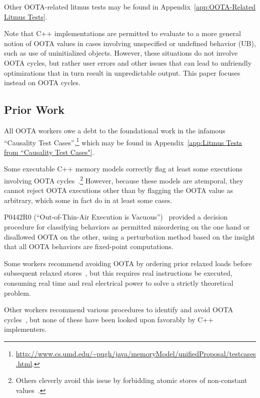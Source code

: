 \documentclass[10]{article}
\begin{document}
Other OOTA-related litmus tests may be found in
Appendix~\ref{app:OOTA-Related Litmus Tests}.

Note that C++ implementations are permitted to evaluate to a more
general notion of OOTA values in cases involving unspecified or undefined
behavior (UB), such as use of uninitialized objects.
However, these situations do not involve OOTA cycles, but rather user
errors and other issues that can lead to unfriendly optimizations that
in turn result in unpredictable output.
This paper focuses instead on OOTA cycles.

\subsection{Prior Work}
\label{sec:Prior Work}

All OOTA workers owe a debt to the foundational work in the infamous
``Causality Test Cases'',\footnote{
	\url{http://www.cs.umd.edu/~pugh/java/memoryModel/unifiedProposal/testcases.html}.}
which may be found in
Appendix~\ref{app:Litmus Tests from “Causality Test Cases"}.

Some executable C++ memory models correctly flag at least some executions
involving OOTA cycles~\cite{JadeAlglave2014HerdingCats}.\footnote{
	Others cleverly avoid this issue by forbidding atomic
	stores of non-constant values~\cite{MarkBatty2011cppmem}.}
However, because these models are atemporal, they cannot reject
OOTA executions other than by flagging the OOTA value as arbitrary,
which some in fact do in at least some cases.

P0442R0 (``Out-of-Thin-Air Execution is Vacuous'')~\cite{PaulEMcKenney2016OOTA}
provided a decision procedure for classifying behaviors as permitted
misordering on the one hand or disallowed OOTA on the other, using
a perturbation method based on the insight that all OOTA behaviors are
fixed-point computations.

Some workers recommend avoiding OOTA by ordering prior relaxed
loads before subsequent relaxed
stores~\cite{Boehm:2014:OGA:2618128.2618134,HansBoehm2019OOTArevisitedAgain,Lahav:2017:RSC:3062341.3062352},
but this requires real instructions be executed, consuming real
time and real electrical power to solve a strictly theoretical
problem.

Other workers recommend various procedures to identify and avoid OOTA
cycles~\cite{Lahav:2017:RSC:3062341.3062352,Sinclair:2017:CAR:3079856.3080206,Lee:10.1145/3385412.3386010,MarkBatty2019ModularRelaxedDependenciesOOTA},
but none of these have been looked upon favorably by C++ implementers.
\end{document}

